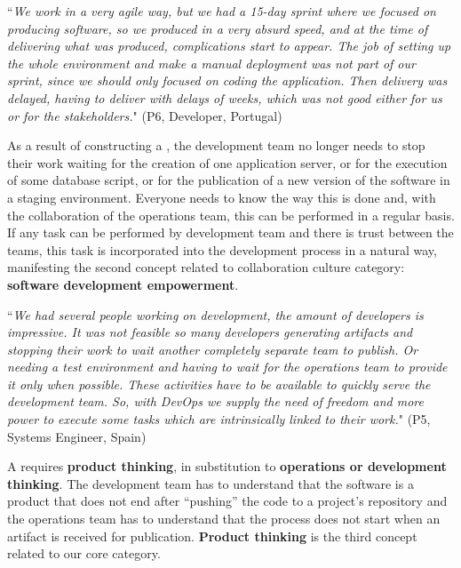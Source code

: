 \begin{mq}
  ``\emph{We work in a very agile way, but we had a 15-day sprint where we focused on
producing software, so we produced in a very absurd speed, and at the time of
delivering what was produced, complications start to appear. The job of setting up
the whole environment and make a manual deployment was not part of our
sprint, since we should only focused on coding the application. Then delivery was delayed,
having to deliver with delays of weeks, which was not good either for us or for
the stakeholders.}" (P6, Developer, Portugal)
\end{mq}

As a result of constructing a , the development
team no longer needs to stop their work waiting for the creation
of one application server, or for the execution of some database script, or for
the publication of a new version of the software in a staging environment.
Everyone needs to know the way this is done and, with the collaboration of the
operations team, this can be performed in a regular basis. If any task can be
performed by development team and there is trust between the teams, this task is
incorporated into the development process in a natural way, manifesting the
second concept related to collaboration culture category: \textbf{software
development empowerment}.

\begin{mq}
``\emph{We had several people working on development, the amount of developers is
impressive. It was not feasible so many developers generating artifacts and
stopping their work to wait another completely separate team to publish. Or
needing a test environment and having to wait for the operations team to
provide it only when possible. These activities have to be available to quickly
serve the development team. So, with DevOps we supply the need of freedom and
more power to execute some tasks which are intrinsically linked to their work.}"
(P5, Systems Engineer, Spain)
\end{mq}

A  requires  \textbf{product thinking}, in substitution to
\textbf{operations or development thinking}. The development team has to understand that
the software is a product that does not end after ``pushing'' the code to a
project's repository and the operations team has to understand that the process does not
start when an artifact is received for publication. \textbf{Product thinking}
is the third concept related to our core category.

